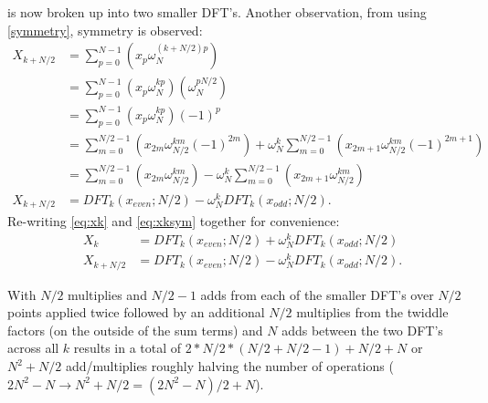 \documentclass{article}
\begin{document}
%
is now broken up into two smaller DFT's.
Another observation, from using \eqref{symmetry}, symmetry is observed:
%
\begin {equation} \label {eq:xksym}
\begin {aligned}
X_{k + N/2} &= \sum_{p = 0}^{N-1} (x_p \omega_N^{(k + N/2) p}) \\
            &= \sum_{p = 0}^{N-1} (x_p \omega_N^{k p}) (\omega_N^{p N/2}) \\
            &= \sum_{p = 0}^{N-1} (x_p \omega_N^{k p}) (-1)^p \\
            &= \sum_{m = 0}^{N/2-1} (x_{2m} \omega_{N/2}^{k m} (-1)^{2m}) + \omega_N^{k} \sum_{m = 0}^{N/2-1} (x_{2m+1} \omega_{N/2}^{km} (-1)^{2m+1}) \\
            &= \sum_{m = 0}^{N/2-1} (x_{2m} \omega_{N/2}^{k m}) - \omega_N^{k} \sum_{m = 0}^{N/2-1} (x_{2m+1} \omega_{N/2}^{km}) \\
X_{k + N/2} &= DFT_k(x_{even}; N/2) - \omega_N^{k} DFT_k(x_{odd}; N/2).
\end {aligned}
\end {equation}
%
Re-writing \eqref{eq:xk} and \eqref{eq:xksym} together for convenience:
%
\begin {equation} \label {eq:kernel}
\begin {aligned}
&X_k         &= DFT_k(x_{even}; N/2) + \omega_N^{k} DFT_k(x_{odd}; N/2) \\
&X_{k + N/2} &= DFT_k(x_{even}; N/2) - \omega_N^{k} DFT_k(x_{odd}; N/2).
\end {aligned}
\end {equation}
%

With $N/2$ multiplies and $N/2 - 1$ adds from each of the smaller DFT's over $N/2$ points applied twice followed by an additional $N/2$ multiplies from the twiddle factors (on the outside of the sum terms) and $N$ adds between the two DFT's across all $k$ results in a total of $2 * N/2 * (N/2 + N/2 - 1) + N/2 + N$ or $N^2 + N/2$ add/multiplies roughly halving the number of operations ($2 N^2 - N \rightarrow N^2 + N/2 = (2 N^2 - N) / 2 + N$).
\end{document}
